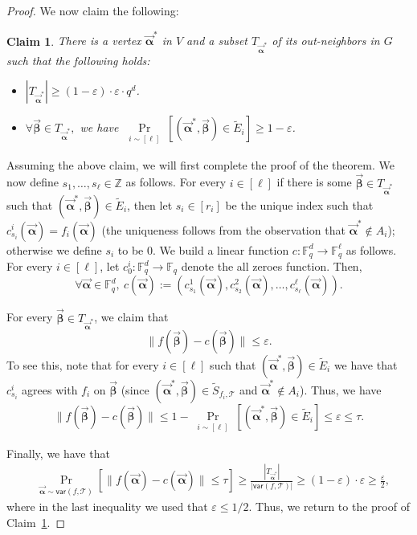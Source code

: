 \documentclass[11pt]{article}
\newcommand{\F}{\mathbb{F}}
\renewcommand{\ge}{ \geqslant}
\renewcommand{\le}{ \leqslant}
\newtheorem{claim}[theorem]{Claim}
\newcommand{\alphab}{\vec{\bm{\alpha}}}
\newcommand{\betab}{\vec{\bm{\beta}}}
\newcommand{\var}{\mathsf{var}}
\renewcommand{\tilde}{\widetilde}
\renewcommand{\kappa}{\tau}
\begin{document}
\begin{proof}
	We now claim the following:
	
	\begin{claim}\label{claimTh3.2}
		There is a vertex $\alphab^*$ in $V$ and a subset $T_{\alphab^*}$ of its out-neighbors in $G$ such that the following holds:
		\begin{itemize}
\item $|T_{\alphab^*}|\ge (1-\varepsilon)\cdot \varepsilon\cdot q^d$. 
\item $\forall \betab\in T_{\alphab^*},$ we have $\underset{\substack{i\sim [\ell]}}{\Pr}\left[\left(\alphab^*,\betab\right)\in \tilde E_i\right]\ge 1-\varepsilon$.
		\end{itemize}
	\end{claim}
	
	Assuming the above claim, we will first complete the proof of the theorem. We now define $s_1,\ldots ,s_{\ell}\in \mathbb{Z}$ as follows. For every  $i\in [\ell]$ if there is some $\betab \in T_{\alphab^*}$ such that $(\alphab^*,\betab)\in \tilde E_i$, then let $s_i\in [r_i]$ be the unique index such that $c_{s_i}^i(\alphab)= f_i(\alphab)$ (the uniqueness follows from the observation that $\alphab^*\notin A_i$); otherwise we define $s_i$ to be 0.
	We build a linear function $c:\F_q^d\to\F_q^\ell$ as follows. For every $i\in [\ell]$, let $c_0^i:\F_q^d\to\F_q$ denote the all zeroes function. Then,
	$$ \forall \alphab\in \F_q^d,\ 
	c(\alphab):=\left(c_{s_1}^1(\alphab),c_{s_2}^2(\alphab),\ldots ,c_{s_{\ell}}^\ell(\alphab)\right).
	$$
	
	
	
	For every $\betab\in T_{\alphab^\ast}$, we claim that $$
	\|f(\betab)-c(\betab)\|\le \varepsilon.
	$$
	To see this, note that for every $i\in[\ell]$ such that $(\alphab^*,\betab)\in\tilde E_i$ we have that $c_{s_i}^i$ agrees with $f_i$ on $\betab$ (since $(\alphab^*,\betab)\in\tilde S_{f_i,\mathcal{T}}$ and $\alphab^*\notin A_i$). Thus, we have 
	$$
	\|f(\betab)-c(\betab)\|\le 1-\underset{\substack{i\sim [\ell]}}{\Pr}\left[\left(\alphab^*,\betab\right)\in \tilde E_i\right]\le \varepsilon \le \tau.
	$$
	
	Finally, we have that 
	\begin{align*}
		&
		\underset{\alphab\sim \var(f,\mathcal{T}) }{\Pr}\left[\|f(\alphab)-c(\alphab)\|\le \kappa \right]\ge \frac{|T_{\alphab^\ast}|}{|\var(f,\mathcal{T})|}\ge (1-\varepsilon)\cdot \varepsilon\ge \frac{\varepsilon}{2},
	\end{align*}
where in the last inequality we used that $\varepsilon\le 1/2$.	Thus, we return to the proof of Claim~\ref{claimTh3.2}.
	

\end{proof}
\end{document}
